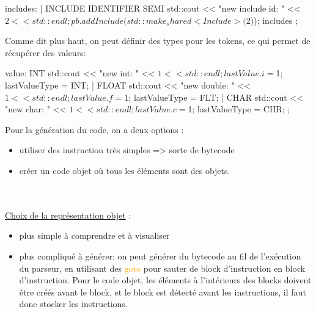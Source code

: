 \documentclass[a4paper]{article}%
\begin{document}
\begin{code}[language=c++]
includes: %
       |
       INCLUDE IDENTIFIER SEMI
       {
         std::cout << "new include id: " << $2 << std::endl;
         pb.addInclude(std::make_shared<Include>($2));
       }
       includes
       ;
\end{code}\leavevmode\newline


Comme dit plus haut, on peut définir des types pour les tokens, ce qui permet de
récupérer des valeurs:

\begin{code}[language=c++]
value: INT {
       std::cout << "new int: " << $1 << std::endl;
       lastValue.i = $1;
       lastValueType = INT;
     } | FLOAT {
       std::cout << "new double: " << $1 << std::endl;
       lastValue.f = $1;
       lastValueType = FLT;
     } | CHAR {
       std::cout << "new char: " << $1 << std::endl;
       lastValue.c = $1;
       lastValueType = CHR;
     }
     ;
\end{code}\leavevmode\newline

Pour la génération du code, on a deux options :
\begin{itemize}
\item utiliser des instruction très simples => sorte de bytecode
\item créer un code objet où tous les éléments sont des objets.
\end{itemize}\leavevmode\\~\\

\underline{Choix de la représentation objet} :
\begin{itemize}
\item plus simple à comprendre et à visualiser
\item plus compliqué à générer: on peut générer du bytecode au fil de l'exécution du parseur, en utilisant des \textcolor{orange}{goto} pour sauter de block d'instruction en block d'instruction. Pour le code objet, les éléments à l'intérieurs des blocks doivent être créés avant le block, et le block est détecté avant les instructions, il faut donc stocker les instructions.
\end{itemize}


\clearpage{}

\printbibliography[keyword={paper},title={Biliographie}]
\printbibliography[keyword={web},title={Webographie}]
\end{document}
